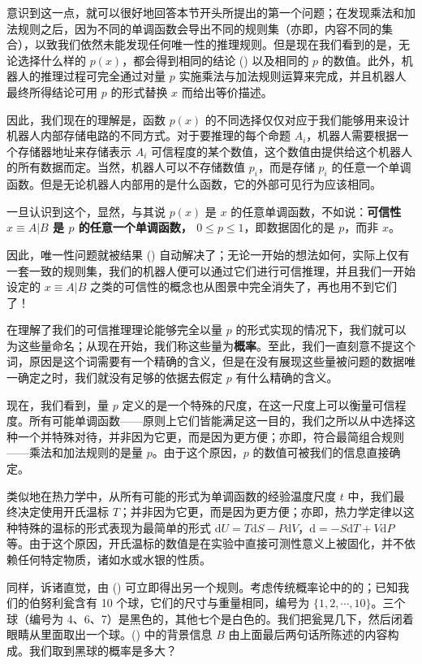 意识到这一点，就可以很好地回答本节开头所提出的第一个问题；在发现乘法和加法规则之后，因为不同的单调函数会导出不同的规则集（亦即，内容不同的集合），以致我们依然未能发现任何唯一性的推理规则。但是现在我们看到的是，无论选择什么样的 $p(x)$，都会得到相同的结论 (\in[2-95]) 以及相同的 $p$ 的数值。此外，机器人的推理过程可完全通过对量 $p$ 实施乘法与加法规则运算来完成，并且机器人最终所得结论可用 $p$ 的形式替换 $x$ 而给出等价描述。

因此，我们现在的理解是，函数 $p(x)$ 的不同选择仅仅对应于我们能够用来设计机器人内部存储电路的不同方式。对于要推理的每个命题 $A_i$，机器人需要根据一个存储器地址来存储表示 $A_i$ 可信程度的某个数值，这个数值由提供给这个机器人的所有数据而定。当然，机器人可以不存储数值 $p_i$，而是存储 $p_i$ 的任意一个单调函数。但是无论机器人内部用的是什么函数，它的外部可见行为应该相同。

一旦认识到这个，显然，与其说 $p(x)$ 是 $x$ 的任意单调函数，不如说：{\bf 可信性 {\tf $x\equiv A|B$} 是 {\tf $p$} 的任意一个单调函数， {\tf $0\le p\le 1$}}，即数据固化的是 $p$，而非 $x$。

因此，唯一性问题就被结果 (\in[2-95]) 自动解决了；无论一开始的想法如何，实际上仅有一套一致的规则集，我们的机器人便可以通过它们进行可信推理，并且我们一开始设定的 $x\equiv A|B$ 之类的可信性的概念也从图景中完全消失了，再也用不到它们了！

在理解了我们的可信推理理论能够完全以量 $p$ 的形式实现的情况下，我们就可以为这些量命名；从现在开始，我们称这些量为{\bf 概率}。至此，我们一直刻意不提这个词，原因是这个词需要有一个精确的含义，但是在没有展现这些量被问题的数据唯一确定之时，我们就没有足够的依据去假定 $p$ 有什么精确的含义。

现在，我们看到，量 $p$ 定义的是一个特殊的尺度，在这一尺度上可以衡量可信程度。所有可能单调函数——原则上它们皆能满足这一目的，我们之所以从中选择这种一个并特殊对待，并非因为它更，而是因为更方便；亦即，符合最简组合规则——乘法和加法规则的是量 $p$。由于这个原因，$p$ 的数值可被我们的信息直接确定。

类似地在热力学中，从所有可能的形式为单调函数的经验温度尺度 $t$ 中，我们最终决定使用开氏温标 $T$；并非因为它更，而是因为更方便；亦即，热力学定律以这种特殊的温标的形式表现为最简单的形式 ${\mathrm{d}}U=T{\mathrm{d}}S - P{\mathrm{d}}V$，${\mathrm{d}} = -S{\mathrm{d}}T + V{\mathrm{d}}P$ 等。由于这个原因，开氏温标的数值是在实验中直接可测性意义上被固化，并不依赖任何特定物质，诸如水或水银的性质。

同样，诉诸直觉，由 (\in[2-95]) 可立即得出另一个规则。考虑传统概率论中的的；已知我们的伯努利瓮含有 10 个球，它们的尺寸与重量相同，编号为 $\{1,2,\cdots,10\}$。三个球（编号为 4、6、7）是黑色的，其他七个是白色的。我们把瓮晃几下，然后闭着眼睛从里面取出一个球。(\in[2-95]) 中的背景信息 $B$ 由上面最后两句话所陈述的内容构成。我们取到黑球的概率是多大？

